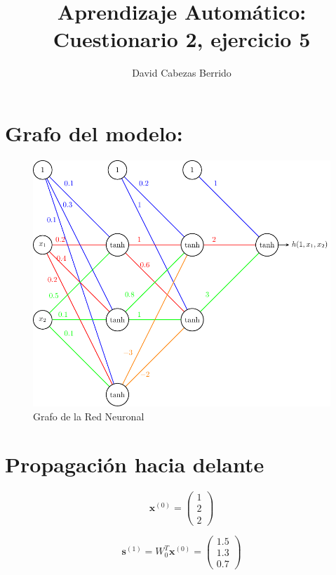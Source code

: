 \documentclass{article}
\begin{document}
\title{Aprendizaje Automático: Cuestionario 2, ejercicio 5}
\author{David Cabezas Berrido}
\maketitle

\section{Grafo del modelo:}

\begin{figure}[H]
  \centering
  \includegraphics[width=180mm]{grafo5.pdf}
  \caption{Grafo de la Red Neuronal}
  \label{fig:graph-nn}
\end{figure}

\newpage
\section{Propagación hacia delante}

\[\textbf{x}^{(0)}=\begin{pmatrix}
    1 \\ 2 \\ 2 
  \end{pmatrix}\]

\[\textbf{s}^{(1)}=W_0^T\textbf{x}^{(0)}=\begin{pmatrix}
    1.5 \\ 1.3 \\ 0.7
  \end{pmatrix}\]
\end{document}
